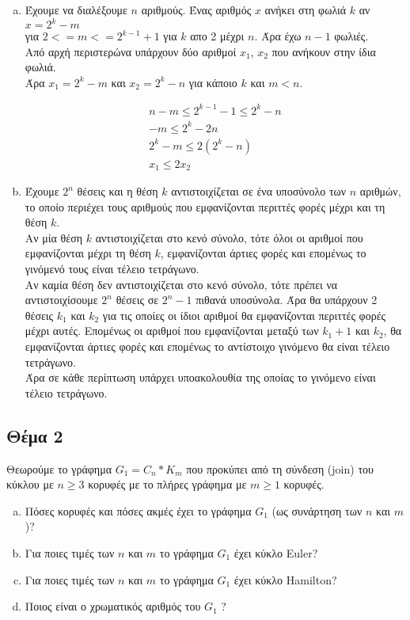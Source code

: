\documentclass{assignment}
\begin{document}
\begin{enumerate}[(a)]

\item Έχουμε να διαλέξουμε $n$ αριθμούς. Ένας αριθμός $x$ ανήκει στη φωλιά $k$ αν $x = 2^k - m$ \\ 
για $2 <= m <= 2^{k-1}+1$ για $k$ απο 2 μέχρι $n$. Άρα έχω $n-1$ φωλιές.\\
Από αρχή περιστερώνα υπάρχουν δύο αριθμοί $x_1$, $x_2$ που ανήκουν στην ίδια φωλιά. \\
Άρα $x_1 = 2^k - m$ και $x_2 = 2^k - n$ για κάποιο $k$ και $m < n$.

\begin{gather*}
n-m \le 2^{k-1} - 1 \le 2^k - n\\
-m \le 2^k - 2n \\
2^k - m \le 2(2^k - n) \\
x_1 \le 2x_2
\end{gather*}

\item Έχουμε $2^n$ θέσεις και η θέση $k$ αντιστοιχίζεται σε ένα υποσύνολο των $n$ αριθμών, το οποίο
περιέχει τους αριθμούς που εμφανίζονται περιττές φορές μέχρι και τη θέση $k$. \\
Αν μία θέση $k$ αντιστοιχίζεται στο κενό σύνολο, τότε όλοι οι αριθμοί που εμφανίζονται μέχρι τη θέση $k$,
εμφανίζονται άρτιες φορές και επομένως το γινόμενό τους είναι τέλειο τετράγωνο. \\
Αν καμία θέση δεν αντιστοιχίζεται στο κενό σύνολο, τότε πρέπει να αντιστοιχίσουμε $2^n$ θέσεις 
σε $2^n - 1$ πιθανά υποσύνολα. Άρα θα υπάρχουν 2 θέσεις $k_1$ και $k_2$ για τις οποίες οι ίδιοι αριθμοί
θα εμφανίζονται περιττές φορές μέχρι αυτές. Επομένως οι αριθμοί που εμφανίζονται μεταξύ των $k_1+1$ και $k_2$,
θα εμφανίζονται άρτιες φορές και επομένως το αντίστοιχο γινόμενο θα είναι τέλειο τετράγωνο.\\
Άρα σε κάθε περίπτωση υπάρχει υποακολουθία της οποίας το γινόμενο είναι τέλειο τετράγωνο.

\end{enumerate}

\newpage\subsection*{Θέμα 2}

Θεωρούμε το γράφημα $G_1 = C_n * K_m$ που προκύπει από τη σύνδεση (\textlatin{join}) του κύκλου με 
$n \ge 3$ κορυφές με το πλήρες γράφημα με $m \ge 1$ κορυφές.

\begin{enumerate}[(a)]

\item 
Πόσες κορυφές και πόσες ακμές έχει το γράφημα $G_1$ (ως συνάρτηση των $n$ και $m$)?
\item
Για ποιες τιμές των $n$ και $m$ το γράφημα $G_1$ έχει κύκλο \textlatin{Euler}?
\item
Για ποιες τιμές των $n$ και $m$ το γράφημα $G_1$ έχει κύκλο \textlatin{Hamilton}?
\item
Ποιος είναι ο χρωματικός αριθμός του $G_1$ ?

\end{enumerate}
\end{document}
